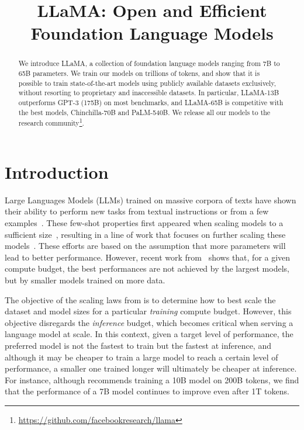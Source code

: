 \title{LLaMA: Open and Efficient Foundation Language Models}

\begin{abstract}
 We introduce LLaMA, a collection of foundation language models ranging from 7B to 65B parameters. We train our models on trillions of tokens, and show that it is possible to train state-of-the-art models using publicly available datasets exclusively, without resorting to proprietary and inaccessible datasets. In particular, LLaMA-13B outperforms GPT-3 (175B) on most benchmarks, and LLaMA-65B is competitive with the best models, Chinchilla-70B and PaLM-540B. We release all our models to the research community\footnote{\notsotiny\url{https://github.com/facebookresearch/llama}}.
\end{abstract}

\section{Introduction}

 Large Languages Models (LLMs) trained on massive corpora of texts have shown their ability to perform new tasks from textual instructions or from a few examples~\cite{brown2020gpt3}. These few-shot properties first appeared when scaling models to a sufficient size~\cite{kaplan2020scaling}, resulting in a line of work that focuses on further scaling these models~\cite{chowdhery2022palm,rae2021goepher}. These efforts are based on the assumption that more parameters will lead to better performance. However, recent work from~\citet{hoffmann2022chinchilla} shows that, for a given compute budget, the best performances are not achieved by the largest models, but by smaller models trained on more data.

 The objective of the scaling laws from \citet{hoffmann2022chinchilla} is to determine how to best scale the dataset and model sizes for a particular \emph{training} compute budget. However, this objective disregards the \emph{inference} budget, which becomes critical when serving a language model at scale. In this context, given a target level of performance, the preferred model is not the fastest to train but the fastest at inference, and although it may be cheaper to train a large model to reach a certain level of performance, a smaller one trained longer will ultimately be cheaper at inference. For instance, although \citet{hoffmann2022chinchilla} recommends training a 10B model on 200B tokens, we find that the performance of a 7B model continues to improve even after 1T tokens.

